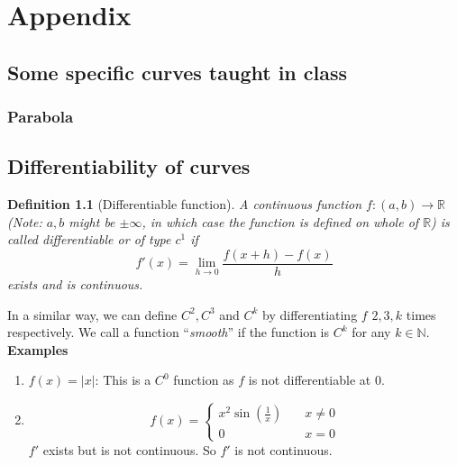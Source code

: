 \documentclass[oneside]{book}\twocolumn
\newtheorem{definition}[theorem]{Definition}
\begin{document}
\chapter{Appendix}
\section{Some specific curves taught in class}
\subsection{Parabola}




\section{Differentiability of curves}
\begin{definition}[Differentiable function]
A continuous function $f:(a,b)\to\mathbb R$(\textit{Note:} $a,b$ might be $\pm \infty$, in which case the function is defined on whole of $\mathbb R$) is called differentiable or of type $c^1$ if $$f'(x)=\lim_{h\to 0}\frac{f(x+h)-f(x)}{h}$$
exists and is continuous.
\end{definition}
In a similar way, we can define $C^2,C^3$ and  $C^k$ by differentiating $f$ $2,3,k$ times respectively. We call a function ``\textit{smooth}'' if the function is $C^k$ for any $k\in\mathbb N$.\\
\textbf{Examples}
\begin{enumerate}
    \item $f(x)=|x|$: This is a $C^0$ function as $f$ is not differentiable at 0.
    \item $$f(x)=\begin{cases}x^2\sin\left(\frac{1}{x}\right)\quad&x\ne0\\
    0\quad&x=0
    \end{cases}$$
    $f'$ exists but is not continuous. So $f'$ is not continuous. 
\end{enumerate}
\end{document}
